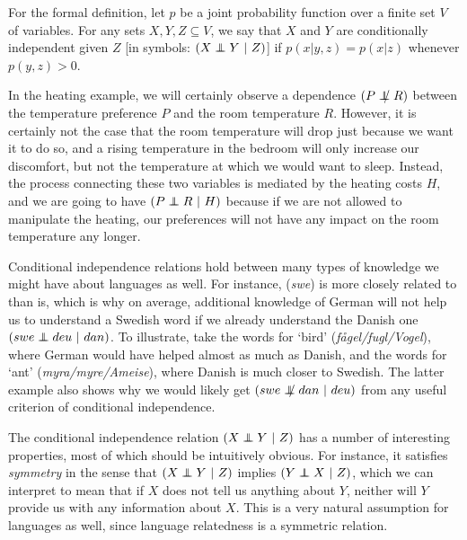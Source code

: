 \newpage 
For the formal definition, let $p$ be a joint probability function over a finite set $V$ of variables. For any sets $X,Y,Z \subseteq V$, we say that $X$ and $Y$ are conditionally independent given $Z$ [in symbols: $(X \independent Y\ |\ Z)$] if $p(x|y,z) = p(x|z)$ whenever $p(y,z) > 0$.

In the heating example, we will certainly observe a dependence $(P \notindep R)$ between the temperature preference $P$ and the room temperature $R$. However, it is certainly not the case that the room temperature will drop just because we want it to do so, and a rising temperature in the bedroom will only increase our discomfort, but not the temperature at which we would want to sleep. Instead, the process connecting these two variables is mediated by the heating costs $H$, and we are going to have $(P \independent R\ |\ H)$ because if we are not allowed to manipulate the heating, our preferences will not have any impact on the room temperature any longer.

Conditional independence relations hold between many types of knowledge we might have about languages as well. For instance,  (\textit{swe}) is more closely related to  than  is, which is why on average, additional knowledge of German will not help us to understand a Swedish word if we already understand the Danish one $(swe \independent deu\ |\ dan)$. To illustrate, take the words for `bird' (\textit{fågel/fugl/Vogel}), where German would have helped almost as much as Danish, and the words for `ant' (\textit{myra/myre/Ameise}), where Danish is much closer to Swedish. The latter example also shows why we would likely get $(swe \notindep dan\ |\ deu)$ from any useful criterion of conditional independence.

The conditional independence relation $(X \independent Y\ |\ Z)$ has a number of interesting properties, most of which should be intuitively obvious. For instance, it satisfies \textit{symmetry} in the sense that $(X \independent Y\ |\ Z)$ implies $(Y \independent X\ |\ Z)$, which we can interpret to mean that if $X$ does not tell us anything about $Y$, neither will $Y$ provide us with any information about $X$. This is a very natural assumption for languages as well, since language relatedness is a symmetric relation. 

